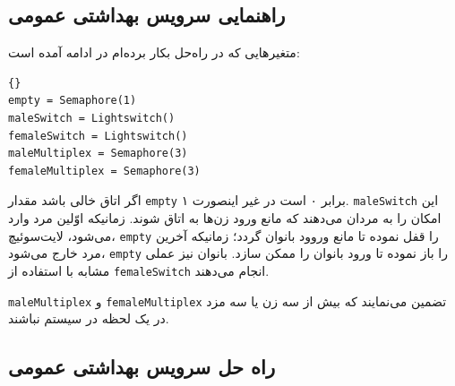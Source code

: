\documentclass{book}
\newcommand{\clearemptydoublepage}{\newpage\cleardoublepage}
\begin{document}

\clearemptydoublepage
\subsection{راهنمایی سرویس بهداشتی عمومی}

    متغیرهایی که در راه‌حل بکار برده‌ام در ادامه آمده است:

\begin{latin}
\begin{lstlisting}[title=\rl{راهنمایی سرویس بهداشتی عمومی}]{}
empty = Semaphore(1)
maleSwitch = Lightswitch()
femaleSwitch = Lightswitch()
maleMultiplex = Semaphore(3)
femaleMultiplex = Semaphore(3)
\end{lstlisting}
\end{latin}

     اگر اتاق خالی باشد مقدار {\tt empty} برابر ۰ است در غیر اینصورت ۱. 
    {\tt maleSwitch} 
    این امکان را به مردان می‌دهند که مانع ورود زن‌ها به اتاق شوند. زمانیکه اوّلین مرد وارد می‌شود، لایت‌سوئیچ، {\tt empty} را قفل نموده تا 
    مانع وروود بانوان گردد؛ زمانیکه آخرین مرد خارج می‌شود، {\tt empty} را باز نموده تا ورود بانوان را ممکن سازد. بانوان نیز 
    عملی مشابه با استفاده از {\tt femaleSwitch} انجام می‌دهند.

    {\tt maleMultiplex} و {\tt femaleMultiplex}  
    تضمین می‌نمایند که بیش از سه زن یا سه مزد در یک لحظه در سیستم نباشند. 


\clearemptydoublepage
\subsection{راه حل سرویس بهداشتی عمومی}
\end{document}
